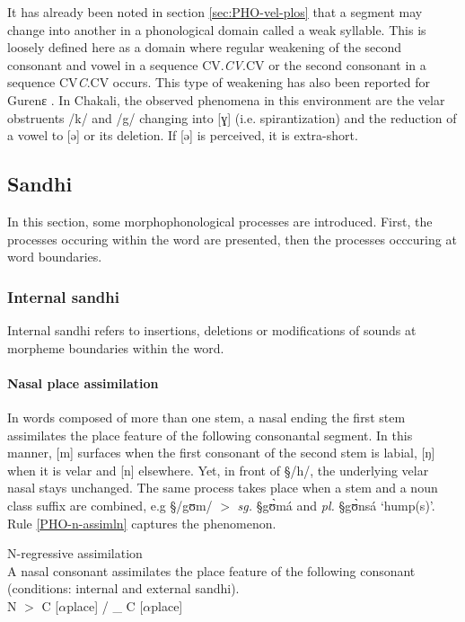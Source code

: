 It has already been noted in section \ref{sec:PHO-vel-plos} that a segment
may change into another in a phonological domain called a weak syllable. This is
loosely defined here as a domain where  regular weakening of  the second
consonant and vowel in a sequence CV.{\it CV}.CV or   the second
consonant in a  sequence CV{\it C}.CV occurs. This type of
weakening has also been reported for Gurenɛ  \cite[iv]{Daku07}. In Chakali,
the observed phenomena in this environment are  the velar obstruents  /k/ and
/g/ changing into [ɣ] (i.e.  spirantization) and the reduction of a
vowel to [ə] or its  deletion. If [ə] is perceived, it is extra-short.


\subsection{Sandhi}
\label{sec:sandhi}

In this section,  some morphophonological processes are introduced. First,
the  processes occuring within the word are presented, then the processes
occcuring at word
boundaries. 

\subsubsection{Internal sandhi}
\label{sec:internal-sandhi}
Internal sandhi  refers to insertions, deletions or modifications of sounds
at morpheme boundaries within the word. 


\paragraph{Nasal place assimilation}
\label{sec:internal-sandhi-nasal-place}

In words composed of more than one stem, a nasal ending the first
stem  assimilates the  place feature of the following consonantal segment. In
this manner, [m] surfaces when  the first consonant of the second stem is
{\sc labial}, [ŋ] when it is {\sc velar}  and   [n] elsewhere. Yet, in front of
{\S /h/}, the underlying velar nasal stays unchanged. The same process takes
place when a stem and a noun class suffix are combined, e.g {\S /gʊm/} $>$ {\it
sg.} 
 {\S gʊ̀má}   and  {\it pl.}  {\S gʊ̀nsá} `hump(s)'. Rule
\ref{PHO-n-assimln}
captures the phenomenon.



\begin{Rule}\label{PHO-n-assimln}{N-regressive assimilation}\\
A nasal consonant assimilates the place feature of the following consonant
 (conditions: internal and external sandhi).\\

 N $>$  C [$\alpha${\sc place}] /  \_  C [$\alpha${\sc place}]
\end{Rule}


